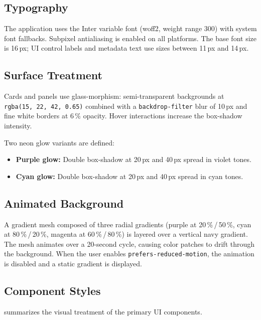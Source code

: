 \documentclass[a4paper, 11pt, oneside]{report}
\begin{document}
\subsection{Typography}

The application uses the Inter variable font (woff2, weight range
300) with system font fallbacks.  Subpixel antialiasing is
enabled on all platforms.  The base font size is 16\,px; UI control labels
and metadata text use sizes between 11\,px and 14\,px.

\subsection{Surface Treatment}

Cards and panels use glass-morphism: semi-transparent backgrounds at
\texttt{rgba(15,\,22,\,42,\,0.65)} combined with a
\texttt{backdrop-filter} blur of 10\,px and fine white
borders at 6\,\% opacity.  Hover interactions increase the box-shadow
intensity.

Two neon glow variants are defined:

\begin{itemize}
  \item \textbf{Purple glow:} Double box-shadow at 20\,px and 40\,px
        spread in violet tones.
  \item \textbf{Cyan glow:} Double box-shadow at 20\,px and 40\,px spread
        in cyan tones.
\end{itemize}

\subsection{Animated Background}

A gradient mesh composed of three radial gradients (purple at
20\,\%\,/\,50\,\%, cyan at 80\,\%\,/\,20\,\%, magenta at
60\,\%\,/\,80\,\%) is layered over a vertical navy gradient.  The mesh
animates over a 20-second cycle, causing color patches to drift through the
background.  When the user enables \texttt{prefers-reduced-motion}, the
animation is disabled and a static gradient is displayed.

\subsection{Component Styles}

 summarizes the visual treatment of the primary
UI components.
\end{document}
